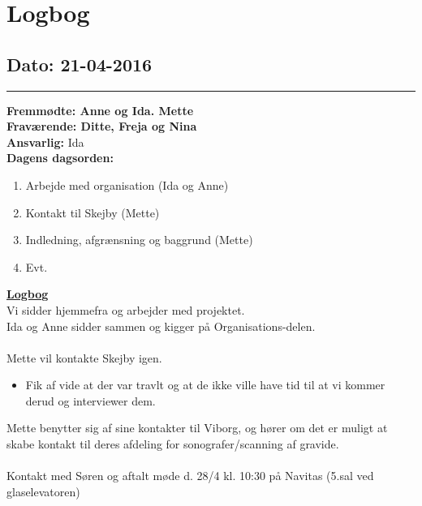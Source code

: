 \chapter{Logbog}
\section{Dato: 21-04-2016}
\hrule
\textbf{Fremmødte: Anne og Ida. Mette} \\
\textbf{Fraværende: Ditte, Freja og Nina } \\
\textbf{Ansvarlig: }Ida  \\
\textbf{Dagens dagsorden: }
\begin{enumerate}
	\item Arbejde med organisation (Ida og Anne)
	\item Kontakt til Skejby (Mette)
	\item Indledning, afgrænsning og baggrund (Mette)
	\item Evt. 
\end{enumerate}


\underline{\textbf{Logbog}}\\
Vi sidder hjemmefra og arbejder med projektet.\\
Ida og Anne sidder sammen og kigger på Organisations-delen.\\\\
Mette vil kontakte Skejby igen.
\begin{itemize}
\item Fik af vide at der var travlt og at de ikke ville have tid til at vi kommer derud og interviewer dem.
\end{itemize}
Mette benytter sig af sine kontakter til Viborg, og hører om det er muligt at skabe kontakt til deres afdeling for sonografer/scanning af gravide.\\
\\
Kontakt med Søren og aftalt møde d. 28/4 kl. 10:30 på Navitas (5.sal ved glaselevatoren)